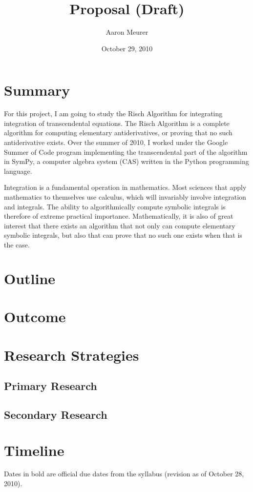 \documentclass[12pt]{article}
\begin{document}
\title{Proposal (Draft)}
\author{Aaron Meurer}
\date{October 29, 2010}
\maketitle
\section{Summary}
For this project, I am going to study the Risch Algorithm for
integrating integration of transcendental equations.  The Risch
Algorithm is a complete algorithm for computing elementary
antiderivatives, or proving that no such antiderivative exists.  Over
the summer of 2010, I worked under the Goo\-gle Summer of Code program
implementing the transcendental part of the algorithm in Sym\-Py, a
computer algebra system (CAS) written in the Py\-thon programming
language.

Integration is a fundamental operation in mathematics.  Most sciences
that apply mathematics to themselves use calculus, which will invariably
involve integration and integrals.  The ability to algorithmically
compute symbolic integrals is therefore of extreme practical importance.
 Mathematically, it is also of great interest that there exists an
algorithm that not only can compute elementary symbolic integrals, but
also that can prove that no such one exists when that is the case.

\section{Outline}

\section{Outcome}

\section{Research Strategies}
\subsection{Primary Research}

\subsection{Secondary Research}
\label{secondary-research}

\section{Timeline}
Dates in bold are official due dates from the syllabus (revision as of
October 28, 2010).
\end{document}
